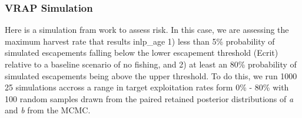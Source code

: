 \documentclass[
  11pt,
]{article}
\begin{document}
\hypertarget{vrap-simulation}{%
\subsubsection{VRAP Simulation}\label{vrap-simulation}}

Here is a simulation fram work to assess risk. In this case, we are
assessing the maximum harvest rate that results inlp\_age 1) less than
5\% probability of simulated escapements falling below the lower
escapement threshold (Ecrit) relative to a baseline scenario of no
fishing, and 2) at least an 80\% probability of simulated escapements
being above the upper threshold. To do this, we run 1000 25 simulations
accross a range in target exploitation rates form 0\% - 80\% with 100
random samples drawn from the paired retained posterior distributions of
\emph{a} and \emph{b} from the MCMC.
\end{document}
